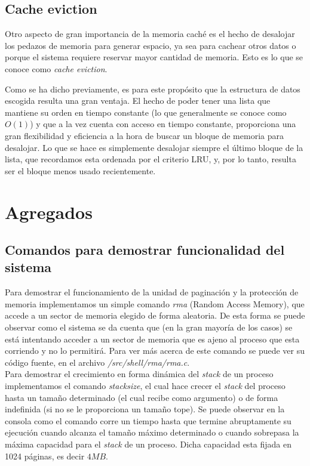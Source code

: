 \documentclass[a4paper,10pt]{article}
\begin{document}
        \subsection{Cache eviction}
        
        Otro aspecto de gran importancia de la memoria caché es el hecho de desalojar los pedazos de memoria para generar espacio, ya sea para cachear otros datos o porque el 
        sistema requiere reservar mayor cantidad de memoria. Esto es lo que se conoce como \textit{cache eviction}.

        Como se ha dicho previamente, es para este propósito que la estructura de datos escogida resulta una gran ventaja. El hecho de poder tener una lista que mantiene su orden en
        tiempo constante (lo que generalmente se conoce como $O(1)$) y que a la vez cuenta con acceso en tiempo constante, proporciona una gran flexibilidad y eficiencia a la hora de 
        buscar un bloque de memoria para desalojar. Lo que se hace es simplemente desalojar siempre el último bloque de la lista, que recordamos esta ordenada por el criterio LRU, 
        y, por lo tanto, resulta ser el bloque menos usado recientemente.  
                

\newpage
\section{Agregados}

        \subsection{Comandos para demostrar funcionalidad del sistema}
             
        Para demostrar el funcionamiento de la unidad de paginación y la protección de memoria implementamos un simple comando \textit{rma} (Random Access Memory), 
        que accede a un sector de memoria elegido de forma aleatoria. De esta forma se puede observar como el sistema se da cuenta que (en la gran mayoría de 
        los casos) se está intentando acceder a un sector de memoria que es ajeno al proceso que esta corriendo y no lo permitirá. Para ver más acerca de este 
        comando se puede ver su código fuente, en el archivo \textit{/src/shell/rma/rma.c}.\\

        Para demostrar el crecimiento en forma dinámica del \textit{stack} de un proceso implementamos el comando \textit{stacksize}, el cual hace crecer el 
        \textit{stack} del proceso hasta un tamaño determinado (el cual recibe como argumento) o de forma indefinida (si no se le proporciona un tamaño tope).
        Se puede observar en la consola como el comando corre un tiempo hasta que termine abruptamente su ejecución cuando alcanza el tamaño máximo determinado 
        o cuando sobrepasa la máxima capacidad para el \textit{stack} de un proceso. Dicha capacidad esta fijada en 1024 páginas, es decir $4 MB$.\\
\end{document}
